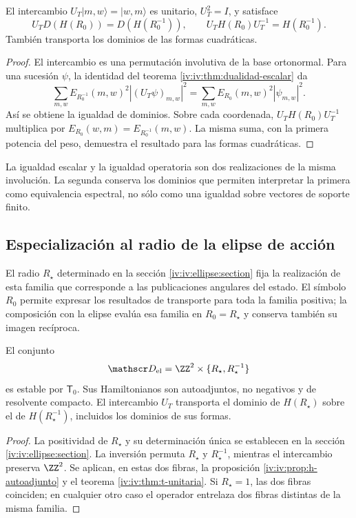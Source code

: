 \begin{theorem}
\label{iv:iv:thm:t-unitaria}
\label{iv:prop:dualidad-radios-k}
El intercambio
\(U_T|m,w\rangle=|w,m\rangle\) es unitario,
\(U_T^2=I\), y satisface
\begin{equation}
 U_TD(H(R_0))=D(H(R_0^{-1})),
 \qquad U_TH(R_0)U_T^{-1}=H(R_0^{-1}).
 \label{iv:iv:eq:conjugacion-h}
\end{equation}
También transporta los dominios de las formas cuadráticas.
\end{theorem}
\begin{proof}
El intercambio es una permutación involutiva de la base
ortonormal. Para una sucesión \(\psi\), la identidad del
teorema \ref{iv:iv:thm:dualidad-escalar} da
\[
 \sum_{m,w}E_{R_0^{-1}}(m,w)^2|(U_T\psi)_{m,w}|^2
 =\sum_{m,w}E_{R_0}(m,w)^2|\psi_{m,w}|^2.
\]
Así se obtiene la igualdad de dominios. Sobre cada coordenada,
\(U_TH(R_0)U_T^{-1}\) multiplica por
\(E_{R_0}(w,m)=E_{R_0^{-1}}(m,w)\). La misma suma, con
la primera potencia del peso, demuestra el resultado para las
formas cuadráticas.
\end{proof}

La igualdad escalar y la igualdad operatoria son dos realizaciones
de la misma involución. La segunda conserva los dominios que
permiten interpretar la primera como equivalencia espectral,
no sólo como una igualdad sobre vectores de soporte finito.

\subsection{Especialización al radio de la elipse de acción}

El radio \(R_\star\) determinado en la sección
\ref{iv:iv:ellipse:section} fija la realización de esta familia que
corresponde a las publicaciones angulares del estado. El símbolo
\(R_0\) permite expresar los resultados de transporte para toda la
familia positiva; la composición con la elipse evalúa esa familia en
\(R_0=R_\star\) y conserva también su imagen recíproca.

\begin{corollary}
\label{iv:iv:cor:radio-especializado}
El conjunto
\[
 \mathscr D_{\mathrm{el}}
 =\ZZ^2\times\{R_\star,R_\star^{-1}\}
\]
es estable por \(\mathsf T_0\). Sus Hamiltonianos son autoadjuntos,
no negativos y de resolvente compacto. El intercambio \(U_T\)
transporta el dominio de \(H(R_\star)\) sobre el de
\(H(R_\star^{-1})\), incluidos los dominios de sus formas.
\end{corollary}
\begin{proof}
La positividad de \(R_\star\) y su determinación única se establecen
en la sección \ref{iv:iv:ellipse:section}. La inversión permuta
\(R_\star\) y \(R_\star^{-1}\), mientras el intercambio preserva
\(\ZZ^2\). Se aplican, en estas dos fibras, la proposición
\ref{iv:iv:prop:h-autoadjunto} y el teorema \ref{iv:iv:thm:t-unitaria}.
Si \(R_\star=1\), las dos fibras coinciden; en cualquier otro caso
el operador entrelaza dos fibras distintas de la misma familia.
\end{proof}

